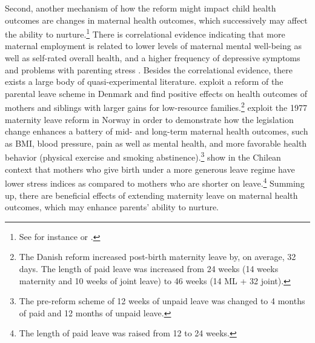 \documentclass[11pt, a4paper,draft]{article} %
\begin{document}
Second, another mechanism of how the reform might impact child health outcomes are
changes in maternal health outcomes, which successively may affect the ability to nurture.\footnote{See for instance \cite{patel2004} or \cite{frech2011maternal}.} There is correlational evidence indicating that more maternal employment is related to lower levels of maternal mental well-being as well as self-rated overall health, and a higher frequency of depressive symptoms and problems with parenting stress \citep{chatterji2005does,Chatterji2013}. Besides the correlational evidence, there exists a large body of quasi-experimental literature. \cite{beuchert2016} exploit a reform of the parental leave scheme in Denmark and find positive effects on health outcomes of mothers and siblings with larger gains for low-resource families.\footnote{The Danish reform increased post-birth maternity leave by, on average, 32 days. The length of paid leave was increased from 24 weeks (14 weeks maternity and 10 weeks of joint leave) to 46 weeks (14 ML + 32 joint).} \cite{butikofer2018impact} exploit the 1977 maternity leave reform in Norway in order to demonstrate how the legislation change enhances a battery of mid- and long-term maternal health outcomes, such as BMI, blood pressure, pain as well as mental health, and more favorable health behavior (physical exercise and smoking abstinence).\footnote{The pre-reform scheme of 12 weeks of unpaid leave was changed to 4 months of paid and 12 months of unpaid leave.} \cite{albagli2018} show in the Chilean context that mothers who give birth under a more generous leave regime have lower stress indices as compared to mothers who are shorter on leave.\footnote{The length of paid leave was raised from 12 to 24 weeks.} Summing up, there are beneficial effects of extending maternity leave on maternal health outcomes, which may enhance parents' ability to nurture.\newline 
\end{document}
